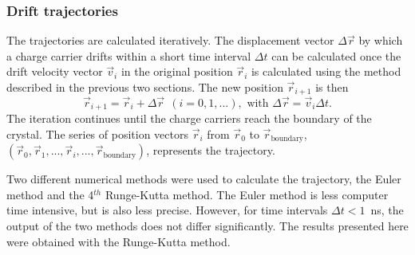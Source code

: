 \documentclass[epj]{svjour}
\begin{document}
\subsubsection{Drift trajectories} 
\label{s:trj} 
The trajectories are calculated iteratively.  The displacement vector
$\Delta \vec{r}$ by which a charge carrier drifts within a short
time interval $\Delta t$ can be calculated once the drift velocity
vector $\vec{v}_{i}$ in the original position $\vec{r}_{i}$ is
calculated using the method described in the previous two sections.
The new position $\vec{r}_{i+1}$ is then
\begin{equation} 
\label{e:pos} 
\vec{r}_{i+1} = \vec{r}_{i} + \Delta \vec{r} \ \ 
(i=0,1,...), \mbox{ with } 
\Delta \vec{r} = \vec{v}_{i} \Delta t. 
\end{equation} 
The iteration continues until the charge carriers reach the boundary
of the crystal. The series of position vectors $\vec{r}_{i}$ from
$\vec{r}_{0}$ to $\vec{r}_{\mbox{boundary}}$, $(\vec{r}_{0},
\vec{r}_{1}, ..., \vec{r}_{i}, ...,
\vec{r}_{\mbox{boundary}})$, represents the trajectory.
 
Two different numerical methods were used to calculate the trajectory,
the Euler method and the 4$^{th}$ Runge-Kutta method.  The Euler
method is less computer time intensive, but is also less precise.
However, for time intervals $\Delta t < 1$~ns, the output of the two
methods does not differ significantly.  The results presented here
were obtained with the Runge-Kutta method.
 
\end{document}
